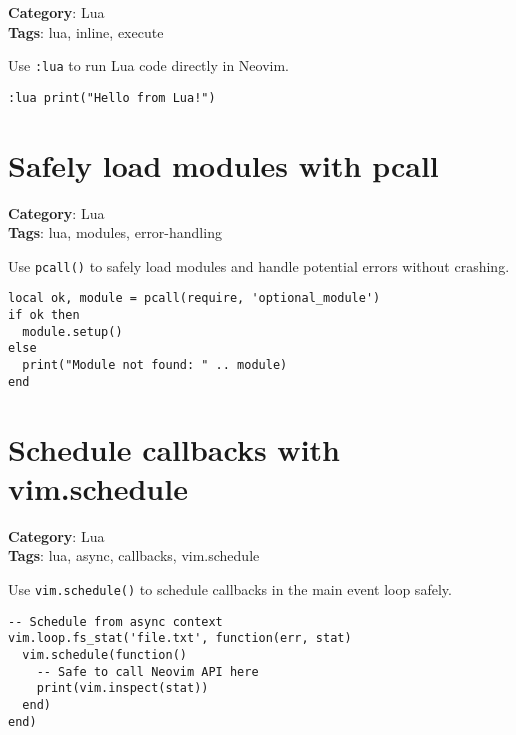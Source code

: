 {{{{{{{\textbf{Category}: Lua\\ \textbf{Tags}: lua, inline, execute
\vspace{0.5cm}

Use {\footnotesize \Verb§:lua§} to run Lua code directly in Neovim.

\begin{Exa*}{}
\begin{Verbatim}[fontsize=\footnotesize, breaklines, breakanywhere]
:lua print("Hello from Lua!")
\end{Verbatim}
\end{Exa*}

\section{Safely load modules with pcall}

\textbf{Category}: Lua\\ \textbf{Tags}: lua, modules, error-handling
\vspace{0.5cm}

Use {\footnotesize \Verb§pcall()§} to safely load modules and handle potential errors without crashing.

\begin{Exa*}{}
\begin{Verbatim}[fontsize=\footnotesize, breaklines, breakanywhere]
local ok, module = pcall(require, 'optional_module')
if ok then
  module.setup()
else
  print("Module not found: " .. module)
end
\end{Verbatim}
\end{Exa*}

\section{Schedule callbacks with vim.schedule}

\textbf{Category}: Lua\\ \textbf{Tags}: lua, async, callbacks, vim.schedule
\vspace{0.5cm}

Use {\footnotesize \Verb§vim.schedule()§} to schedule callbacks in the main event loop safely.

\begin{Exa*}{}
\begin{Verbatim}[fontsize=\footnotesize, breaklines, breakanywhere]
-- Schedule from async context
vim.loop.fs_stat('file.txt', function(err, stat)
  vim.schedule(function()
    -- Safe to call Neovim API here
    print(vim.inspect(stat))
  end)
end)
\end{Verbatim}
\end{Exa*}

}}}}}}}
